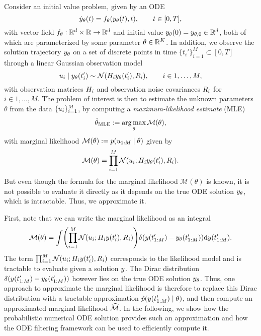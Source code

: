 \documentclass{mimosis}
\begin{document}
Consider an initial value problem, given by an ODE
\begin{equation}
  \label{eq:fenrir:ode}
  \dot{\val}_\theta(t) = \vf_\theta(\val_\theta(t), t), \qquad t \in [0, T],
\end{equation}
with vector field \(\vf_\theta: \mathbb{R}^\numdims \times \mathbb{R} \to \mathbb{R}^\numdims\)
and initial value \(y_\theta(0) = y_{\theta,0} \in \mathbb{R}^d\),
both of which are parameterized by some parameter \(\theta \in \mathbb{R}^K\).
In addition, we observe the solution trajectory \(y_\theta\) on a set of discrete points in time
\(\{t_i'\}_{i=1}^M \subset [0, T]\)
through a linear Gaussian observation model
\begin{equation}
  \label{eq:fenrir:observations}
  \oobs_i \mid \val_\theta(t_i') \sim \N( \obsA_i \val_\theta(t_i'), \obsC_i ), \qquad i \in 1, \dots, M,
\end{equation}
with observation matrices \(H_i\) and observation noise covariances \(R_i\) for \(i \in 1, \dots, M\).
The problem of interest is then to estimate the unknown parameters \(\theta\) from the data \(\{u_i\}_{i=1}^M\),
by computing
a \emph{maximum-likelihood estimate} (MLE)
\begin{equation}
  \label{eq:fenrir:mle}
  \hat{\theta}_\text{MLE} := \operatorname*{arg\,max}_\theta \mathcal{M}(\theta),
\end{equation}
with marginal likelihood \(\mathcal{M}(\theta) := \p(\oobs_{1:M} \mid \theta)\)
given by
\begin{equation}
  \label{eq:fenrir:marginallikelihood}
  \mathcal{M}(\theta) = \prod_{i=1}^M \N( \oobs_i; \obsA_i \val_\theta(t_i'), \obsC_i ).
\end{equation}
But even though the formula for the marginal likelihood \(\mathcal{M}(\theta)\) is known, it is not possible to evaluate it directly as it depends on the true ODE solution \(y_\theta\), which is intractable.
Thus, we approximate it.

First, note that we can write the marginal likelihood as an integral
\begin{equation}
  \label{eq:fenrir:marginallikelihood2}
  \mathcal{M}(\theta) = \int
    \left( \prod_{i=1}^M \N( \oobs_i; \obsA_i \val \left(t_i'\right), \obsC_i ) \right)
    \dirac( \val \left(t_{1:M}'\right) - \val_\theta \left(t_{1:M}'\right) )
  \dd \val(t_{1:M}').
\end{equation}
The term \(\prod_{i=1}^M \N( \oobs_i; \obsA_i \val \left(t_i'\right), \obsC_i )\) corresponds to the likelihood model and is tractable to evaluate given a solution \(y\).
The Dirac distribution \(\dirac( \val \left(t_{1:M}'\right) - \val_\theta \left(t_{1:M}'\right) )\) however lies on the true ODE solution \(y_\theta\).
Thus,
one approach to approximate the marginal likelihood is therefore to replace this Dirac distribution with a tractable approximation
\(\hat{p}(\val \left(t_{1:M}'\right) \mid \theta)\),
and then compute an approximated marginal likelihood
\(\widehat{\mathcal{M}}\).
In the following, we show how the probabilistic numerical ODE solution provides such an approximation and how the ODE filtering framework can be used to efficiently compute it.
\end{document}
